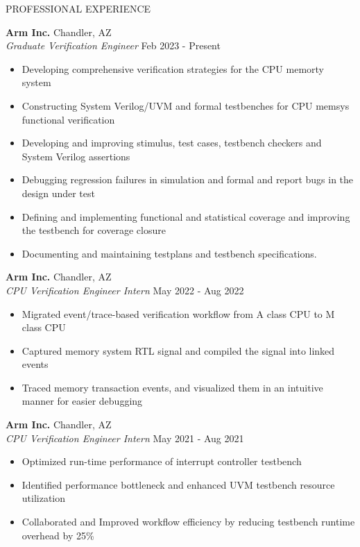 \documentclass{resume} %
\begin{document}
  \begin{rSection}{PROFESSIONAL EXPERIENCE}

    \textbf{Arm Inc.}                           \hfill Chandler, AZ\\
    \emph{Graduate Verification Engineer}       \hfill Feb 2023 - Present\\
    \LineShrinkBeforeItem
    \begin{itemize} [leftmargin=1em]
      \itemsep -0.6em
      \item Developing comprehensive verification strategies for the CPU memorty system
      \item Constructing System Verilog/UVM and formal testbenches for CPU memsys functional verification
      \item Developing and improving stimulus, test cases, testbench checkers and System Verilog assertions
      \item Debugging regression failures in simulation and formal and report bugs in the design under test
      \item Defining and implementing functional and statistical coverage and improving the testbench for coverage closure
      \item Documenting and maintaining testplans and testbench specifications.
    \end{itemize}

    \textbf{Arm Inc.}                           \hfill Chandler, AZ\\
    \emph{CPU Verification Engineer Intern}     \hfill May 2022 - Aug 2022\\
    \LineShrinkBeforeItem
    \begin{itemize} [leftmargin=1em]
      \itemsep -0.6em
      \item Migrated event/trace-based verification workflow from A class CPU to M class CPU
      \item Captured memory system RTL signal and compiled the signal into linked events
      \item Traced memory transaction events, and visualized them in an intuitive manner for easier debugging
    \end{itemize}


    \textbf{Arm Inc.}                           \hfill Chandler, AZ\\
    \emph{CPU Verification Engineer Intern}     \hfill May 2021 - Aug 2021\\
    \LineShrinkBeforeItem
    \begin{itemize} [leftmargin=1em]
      \itemsep -0.6em
      \item Optimized run-time performance of interrupt controller testbench
      \item Identified performance bottleneck and enhanced UVM testbench resource utilization
      \item Collaborated and Improved workflow efficiency by reducing testbench runtime overhead by 25\%
    \end{itemize}

  \end{rSection}
\end{document}
